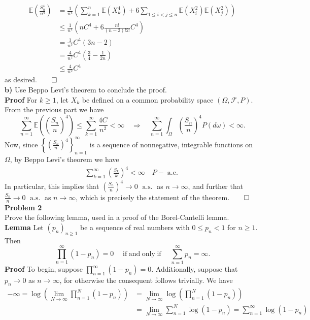 \documentclass[10pt]{article}
\newcommand{\E}{\mathbb{E}}
\newcommand{\bp}[1]{\left({#1}\right)}
\newcommand{\1}[1]{\mathbbm{1}_{#1}}
\newcommand{\mc}[1]{\mathcal{#1}}
\DeclareMathOperator{\as}{a.s.}
\DeclareMathOperator{\ale}{a.e.}
\DeclareMathOperator{\ifff}{if\;and\;only\;if}
\begin{document}
    \begin{align*}
        \E\bp{\frac{S_n^4}{n^4}}&=\frac{1}{n^4}\bp{\sum_{k=1}^n\E(X_k^4)+6\sum_{1\leq i<j\leq n}\E(X_i^2)\E(X_j^2)}\\
        &\leq \frac{1}{n^4}\bp{nC^4+6\frac{n!}{(n-2)!2!}C^4}\\
        &=\frac{1}{n^3}C^4\bp{3n-2}\\
        &=\frac{4}{n^2}C^4\bp{\frac{3}{4}-\frac{1}{2n}}\\
        &\leq \frac{4}{n^2}C^4
    \end{align*}
    as desired.\hfill{$\qed$}\\[5pt]
    {\bf b)}\hspace{5pt} Use Beppo Levi's theorem to conclude the proof.\\[5pt]
    {\bf Proof}\hspace{5pt} For $k\geq 1$, let $X_k$ be defined on a common probability space $(\Omega,\mc{F},P)$. From the previous part we have
    \[\sum_{n=1}^\infty\E\bp{\bp{\frac{S_n}{n}}^4}\leq\sum_{k=1}^\infty\frac{4C}{n^2}<\infty\quad\Rightarrow\quad\sum_{n=1}^\infty\int_{\Omega}\bp{\frac{S_n}{n}}^4P(d\omega)<\infty.\]
    Now, since $\left\{\bp{\tfrac{S_n}{n}}^4\right\}_{n=1}^\infty$ is a sequence of nonnegative, integrable functions on $\Omega$, by Beppo Levi's theorem we have
    \begin{align*}
        \sum_{k=1}^\infty\bp{\frac{S_k}{k}}^4<\infty\quad P-\ale
    \end{align*} 
    In particular, this implies that $\bp{\tfrac{S_n}{n}}^4\rightarrow 0$ $\as$ as $n\rightarrow\infty$, and further that $\tfrac{S_n}{n}\rightarrow 0$ $\as$ as $n\rightarrow\infty$, which is precisely the statement of the theorem.\hfill{$\qed$}\\[5pt]
    {\bf Problem 2}\\[5pt]
    Prove the following lemma, used in a proof of the Borel-Cantelli lemma.\\[5pt]
    {\bf Lemma}\hspace{5pt} Let $(p_n)_{n\geq 1}$ be a sequence of real numbers with $0\leq p_n<1$ for $n\geq 1$. Then
    \[\prod_{n=1}^\infty(1-p_n)=0\quad\ifff\quad\sum_{n=1}^\infty p_n=\infty.\]
    {\bf Proof}\hspace{5pt} To begin, suppose $\prod_{n=1}^\infty(1-p_n)=0$. Additionally, suppose that $p_n\rightarrow 0$ as $n\rightarrow \infty$, for otherwise the consequent follows trivially. We have
    \begin{align*}
        -\infty=\log\bp{\lim_{N\rightarrow\infty}\prod_{n=1}^N(1-p_n)}&=\lim_{N\rightarrow\infty}\log\bp{\prod_{n=1}^N(1-p_n)}\tag{continuity of logarithms}\\
        &=\lim_{N\rightarrow\infty}\sum_{n=1}^N\log(1-p_n)=\sum_{n=1}^\infty\log(1-p_n)
    \end{align*}
\end{document}

